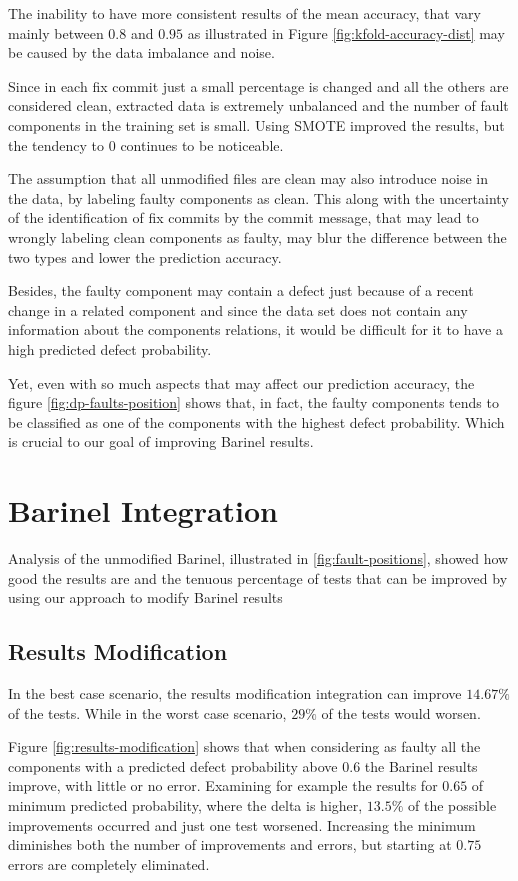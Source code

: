 The inability to have more consistent results of the mean accuracy, that vary mainly between $0.8$ and $0.95$ as illustrated in Figure \ref{fig:kfold-accuracy-dist} may be caused by the data imbalance and noise.

Since in each fix commit just a small percentage is changed and all the others are considered clean, extracted data is extremely unbalanced and the number of fault components in the training set is small. Using SMOTE improved the results, but the tendency to $0$ continues to be noticeable.

The assumption that all unmodified files are clean may also introduce noise in the data, by labeling faulty components as clean. This along with the uncertainty of the identification of fix commits by the commit message, that may lead to wrongly labeling clean components as faulty, may blur the difference between the two types and lower the prediction accuracy.

Besides, the faulty component may contain a defect just because of a recent change in a related component and since the data set does not contain any information about the components relations, it would be difficult for it to have a high predicted defect probability.

Yet, even with so much aspects that may affect our prediction accuracy, the figure \ref{fig:dp-faults-position} shows that, in fact, the faulty components tends to be classified as one of the components with the highest defect probability. Which is crucial to our goal of improving Barinel results.

\section{Barinel Integration}

Analysis of the unmodified Barinel, illustrated in \ref{fig:fault-positions}, showed how good the results are and the tenuous percentage of tests that can be improved by using our approach to modify Barinel results

\subsection{Results Modification}

In the best case scenario, the results modification integration can improve $14.67\%$ of the tests. While in the worst case scenario, $29\%$ of the tests would worsen.

Figure \ref{fig:results-modification} shows that when considering as faulty all the components with a predicted defect probability above $0.6$ the Barinel results improve, with little or no error. Examining for example the results for $0.65$ of minimum predicted probability, where the delta is higher, $13.5\%$ of the possible improvements occurred and just one test worsened. Increasing the minimum diminishes both the number of improvements and errors, but starting at $0.75$ errors are completely eliminated.


